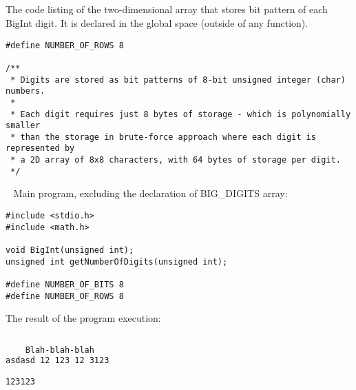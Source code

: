 \documentclass{article}
\begin{document}
\paragraph{}\
\paragraph{}\

	
	\noindent The code listing of the two-dimensional array that stores bit pattern of each BigInt digit. It is declared in the global space (outside of any function).
	
	\begin{verbatim}
#define NUMBER_OF_ROWS 8

/**
 * Digits are stored as bit patterns of 8-bit unsigned integer (char) numbers.
 *
 * Each digit requires just 8 bytes of storage - which is polynomially smaller
 * than the storage in brute-force approach where each digit is represented by
 * a 2D array of 8x8 characters, with 64 bytes of storage per digit.
 */
	\end{verbatim}
	
	\rmfamily\
	\newline
	\noindent Main program, excluding the declaration of BIG_DIGITS array:
	
	\begin{verbatim}
#include <stdio.h>
#include <math.h>

void BigInt(unsigned int);
unsigned int getNumberOfDigits(unsigned int);

#define NUMBER_OF_BITS 8
#define NUMBER_OF_ROWS 8
	\end{verbatim}
	
	
	\noindent The result of the program execution:
	
	\begin{lstlisting}[basicstyle=\fontsize{7}{9}\ttfamily, language=bash]%[basicstyle=\tiny, %or \small or \footnotesize etc.]
	
	Blah-blah-blah
asdasd 12 123 12 3123 

123123

	\end{lstlisting}
	
	
\paragraph{}\
\paragraph{}\
\end{document}
